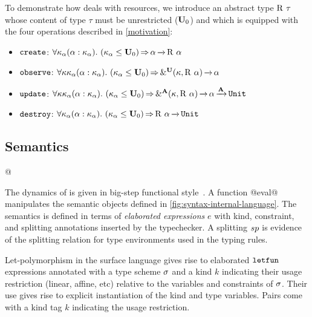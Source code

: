 To demonstrate how \lang{} deals with resources, we introduce an abstract
type $\tapp{\tres}{\tau}$ whose content of type $\tau$ must be
unrestricted ($\kun_0$) and which is equipped with the four
operations described in \cref{motivation}: 
\begin{itemize}[topsep=0pt]
\item
$\create$:
$\forall{\kvar_\tvar}\bvar{\tvar}{\kvar_\tvar}.\
\qual{\Cleq {\kvar_\tvar} {\kun_0}}
{\tvar \tarr{} \tapp\tres\tvar}$
\item
$\observe$:
$\forall{\kvar\kvar_\tvar}\bvar{\tvar}{\kvar_\tvar}.\
\qual{\Cleq {\kvar_\tvar} {\kun_0}}
{\borrowty[\IBORROW]{\kvar}{\tapp\tres\tvar} \tarr{} \tvar}$
\item
$\update$:
$\forall{\kvar\kvar_\tvar}\bvar{\tvar}{\kvar_\tvar}.\
\qual{\Cleq {\kvar_\tvar} {\kun_0}}
\borrowty[\MBORROW]{\kvar}{\tapp\tres\tvar} \tarr{} \tvar \tarr{\kaff} \tunit$
\item
$\destroy$:
$\forall{\kvar_\tvar}\bvar{\tvar}{\kvar_\tvar}.\
\qual{\Cleq {\kvar_\tvar} {\kun_0}}
\tapp\tres\tvar \tarr{} \tunit$
\end{itemize}

\subsection{Semantics}
\label{sec:sem}


\lstMakeShortInline[keepspaces,basicstyle=\normalsize\normalfont]@

The dynamics of \lang is given in big-step
functional
style~\cite{siek13:_type_safet_three_easy_lemmas,DBLP:conf/esop/OwensMKT16,
  DBLP:conf/popl/AminR17}.  A function
@eval@
manipulates the semantic objects defined in
\cref{fig:syntax-internal-language}.
%
The semantics is defined in terms of \emph{elaborated expressions} $e$
with kind, constraint, and splitting annotations inserted by the typechecker.
A splitting $\Sp$ is evidence of the splitting relation for type environments
used in the typing rules.

Let-polymorphism in the surface language gives rise to elaborated
$\eletfun$ expressions annotated with a type scheme $\schm$ and a kind $k$ indicating their
usage restriction (linear, affine, etc) relative to the variables and
constraints of $\schm$. Their use
gives rise to explicit instantiation of the kind and type variables.
Pairs come with a kind tag $k$ indicating the usage restriction.

